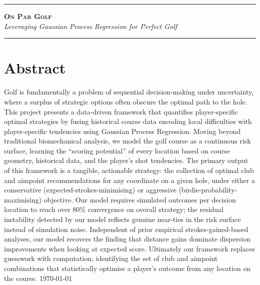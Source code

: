 \documentclass[11pt, letterpaper]{article}
\begin{document}
\begin{titlepage}
   \begingroup 
    \centering
    \vspace*{2.5cm}
    
    \rule{\textwidth}{1.5pt}\vspace{0.5cm}
    
    {\huge \bfseries \scshape On Par Golf} \\
    \vspace{0.3cm}
    {\Large \itshape Leveraging Gaussian Process Regression for Perfect Golf} %
    
    \vspace{0.5cm}
    \rule{\textwidth}{1.5pt}
    
    \vspace{3cm}
   \endgroup 
    
    \section*{Abstract}
    \noindent
       Golf is fundamentally a problem of sequential decision-making under uncertainty, where a surplus of strategic options often obscure the optimal path to the hole. This project presents a data-driven framework that quantifies player-specific optimal strategies by fusing historical course data encoding local difficulties with player-specific tendencies using Gaussian Process Regression. Moving beyond traditional biomechanical analysis, we model the golf course as a continuous risk surface, learning the ``scoring potential'' of every location based on course geometry, historical data, and the player's shot tendencies. The primary output of this framework is a tangible, actionable strategy: the collection of optimal club and aimpoint recommendations for any coordinate on a given hole, under either a conservative (expected-strokes-minimising) or aggressive (birdie-probability-maximising) objective. Our model requires \fillin simulated outcomes per decision location to reach over 80\% convergence on overall strategy; the residual instability detected by our model reflects genuine near-ties in the risk surface instead of simulation noise. Independent of prior empirical strokes-gained-based analyses, our model recovers the finding that distance gains dominate dispersion improvements when looking at expected score. Ultimately our framework replaces guesswork with computation, identifying the set of club and aimpoint combinations that statistically optimise a player's outcome from any location on the course.
    \vfill
    \today
\end{titlepage}
\end{document}
